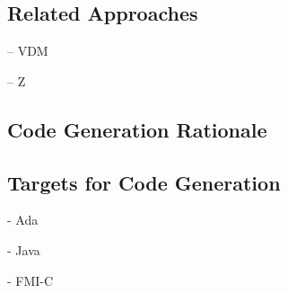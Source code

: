 \subsection{Related Approaches}



-- VDM


-- Z
\subsection{Code Generation Rationale}


\subsection{Targets for Code Generation}

- Ada

- Java

- FMI-C
